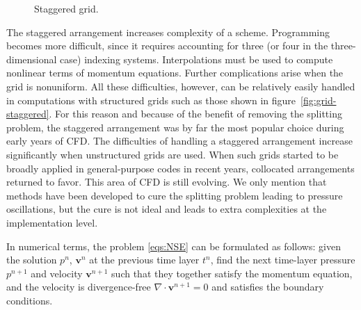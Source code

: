 \documentclass{article}
\numberwithin{equation}{section}
\begin{document}
\begin{figure}[H]
\centering
   \quad
\caption{\small Staggered grid.}
\end{figure}


The staggered arrangement increases complexity of a scheme. Programming becomes more difficult, since it requires accounting for three (or four in the three-dimensional case) indexing systems. Interpolations must be used to compute nonlinear terms of momentum equations. Further complications arise when the grid is nonuniform. All these difficulties, however, can be relatively easily handled in computations with structured grids such as those shown in figure~\ref{fig:grid-staggered}. For this reason and because of the benefit of removing the splitting problem, the staggered arrangement was by far the most popular choice during early years of CFD. The difficulties of handling a staggered arrangement increase significantly when unstructured grids are used. When such grids started to
be broadly applied in general-purpose codes in recent years, collocated arrangements returned to favor. This area of CFD is still evolving. We only mention that methods have been developed to cure the splitting problem leading to pressure oscillations, but the cure is not ideal and leads to extra complexities at the implementation level.

In numerical terms, the problem \cref{eqs:NSE} can be formulated as follows: given the solution $p^{n}$, $\boldsymbol{v}^{n}$ at the previous time layer $t^{n}$, find the next time-layer pressure $p^{n+1}$ and velocity $\boldsymbol{v}^{n+1}$ such that they together satisfy the momentum equation, and the velocity is divergence-free $\nabla \cdot \boldsymbol{v}^{n+1} = 0$ and satisfies the boundary conditions.
\end{document}
